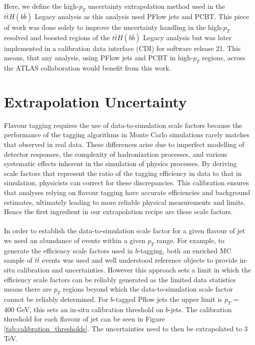 \\
\\
Here, we define the high-$p_T$ uncertainty extrapolation method used in the $t\bar{t}H(b\bar{b})$ Legacy analysis as this analysis used PFlow jets and PCBT. This piece of work was done solely to improve the uncertainty handling in the high-$p_T$ resolved and boosted regions of the $t\bar{t}H(b\bar{b})$ Legacy analysis but was later implemented in a calibration data interface (CDI) for software release 21. This means, that any analysis, using PFlow jets and PCBT in high-$p_T$ regions, across the ATLAS collaboration would benefit from this work.

\section{Extrapolation Uncertainty} \label{sec:extrap}
Flavour tagging requires the use of data-to-simulation scale factors because the performance of the tagging algorithms in Monte Carlo simulations rarely matches that observed in real data. These differences arise due to imperfect modelling  of detector responses, the complexity of hadronization processes, and various systematic effects inherent in the simulation of physics processes. By deriving scale factors that represent the ratio of the tagging efficiency in data to that in simulation, physicists can correct for these discrepancies. This calibration ensures that analyses relying on flavour tagging have accurate efficiencies and background estimates, ultimately leading to more reliable physical measurements and limits. Hence the first ingredient in our extrapolation recipe are these scale factors.
\\
\\
In order to establish the data-to-simulation scale factor for a given flavour of jet we need an abundance of events within a given $p_T$ range. For example, to generate the efficiency scale factors used in $b$-tagging, both an enriched MC sample of $t\bar{t}$ events was used and well understood reference objects to provide in-situ calibration and uncertainties. However this approach sets a limit in which the efficiency scale factors can be reliably generated as the limited data statistics means there are $p_T$ regions beyond which the data-to-simulation scale factor cannot be reliably determined.
 For $b$-tagged Pflow jets the upper limit is $p_T$ = 400 GeV, this sets an in-situ calibration threshold on $b$-jets. The calibration threshold for each flavour of jet can be seen in Figure \ref{tab:calibration_thresholds}. The uncertainties need to then be extrapolated to 3 TeV.
